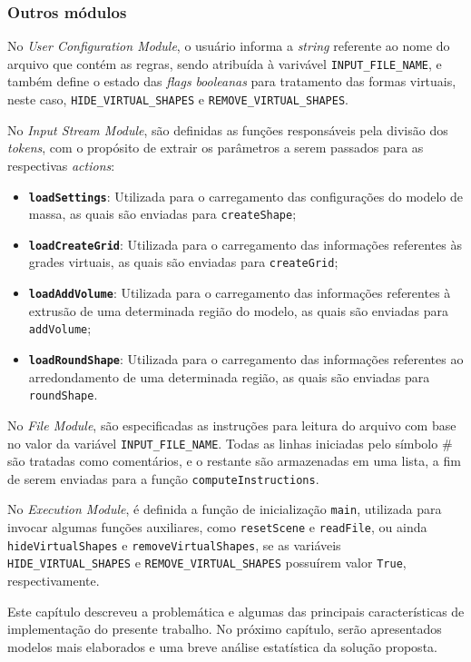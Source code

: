 \clearpage

\subsubsection{Outros módulos}
\label{sec:outros_modulos}

No \textit{User Configuration Module}, o usuário informa a \textit{string} referente ao nome do arquivo que contém as regras, sendo atribuída à varivável \texttt{INPUT\_FILE\_NAME}, e também define o estado das \textit{flags} \textit{booleanas} para tratamento das formas virtuais, neste caso, \texttt{HIDE\_VIRTUAL\_SHAPES} e \texttt{REMOVE\_VIRTUAL\_SHAPES}.

No \textit{Input Stream Module}, são definidas as funções responsáveis pela divisão dos \textit{tokens}, com o propósito de extrair os parâmetros a serem passados para as respectivas \textit{actions}:

\vspace{0.3cm}

\begin{itemize}
    \item \textbf{\texttt{loadSettings}}: Utilizada para o carregamento das configurações do modelo de massa, as quais são enviadas para \texttt{createShape};
    
    \item \textbf{\texttt{loadCreateGrid}}: Utilizada para o carregamento das informações referentes às grades virtuais, as quais são enviadas para \texttt{createGrid};
    
    \item \textbf{\texttt{loadAddVolume}}: Utilizada para o carregamento das informações referentes à extrusão de uma determinada região do modelo, as quais são enviadas para \texttt{addVolume};
    
    \item \textbf{\texttt{loadRoundShape}}: Utilizada para o carregamento das informações referentes ao arredondamento de uma determinada região, as quais são enviadas para \texttt{roundShape}.
\end{itemize}

No \textit{File Module}, são especificadas as instruções para leitura do arquivo com base no valor da variável \texttt{INPUT\_FILE\_NAME}. Todas as linhas iniciadas pelo símbolo $\#$ são tratadas como comentários, e o restante são armazenadas em uma lista, a fim de serem enviadas para a função \texttt{computeInstructions}.

No \textit{Execution Module},  é definida a função de inicialização \texttt{main}, utilizada para invocar algumas funções auxiliares, como \texttt{resetScene} e \texttt{readFile}, ou ainda \texttt{hideVirtualShapes} e \texttt{removeVirtualShapes}, se as variáveis \texttt{HIDE\_VIRTUAL\_SHAPES} e \texttt{REMOVE\_VIRTUAL\_SHAPES} possuírem valor \texttt{True}, respectivamente.

\vspace{1cm}

Este capítulo descreveu a problemática e algumas das principais características de implementação do presente trabalho. No próximo capítulo, serão apresentados modelos mais elaborados e uma breve análise estatística da solução proposta.